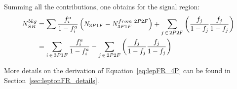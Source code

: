 Summing all the contributions, one obtains for the signal region:
\begin{equation}
  \begin{split}
    \label{eq:lepFR_4P}
    N^{bkg}_{SR} &= \sum \frac{f^a_i}{1-f^a_i} \left( N_{3P1F} - N^{from\ 2P2F}_{3P1F} \right) + \sum_{j \,\in\, 2P2F} \left( \frac{f_j}{1-f_j} \frac{f_j}{1-f_j} \right)
    \\
                 &= \sum_{i \,\in\, 3P1F} \frac{f^a_i}{1-f^a_i} - \sum_{j \,\in\, 2P2F} \left( \frac{f_j}{1-f_j} \frac{f_j}{1-f_j} \right)
  \end{split}
\end{equation}

More details on the derivation of Equation~\ref{eq:lepFR_4P} can be found in Section~\ref{sec:leptonFR_details}.
